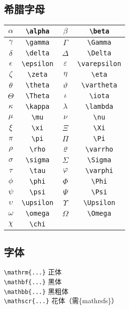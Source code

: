 \documentclass[a4paper,10pt]{ctexart}
\begin{document}
\subsection{希腊字母}
\noindent
\begin{table}[H]
	\begin{center}
		\begin{tabular}{|c|c|c|c|}
		\hline
		$\alpha$ &\verb|\alpha| &$\beta$ &\verb|\beta|\\
		\hline
		$\gamma$ &\verb|\gamma| &$\Gamma$ &\verb|\Gamma|\\
		\hline
		$\delta$ &\verb|\delta| &$\Delta$ &\verb|\Delta|\\
		\hline
		$\epsilon$ &\verb|\epsilon| &$\varepsilon$ &\verb|\varepsilon|\\
		\hline
		$\zeta$ &\verb|\zeta| &$\eta$ &\verb|\eta|\\
		\hline
		$\theta$ &\verb|\theta| &$\vartheta$ &\verb|\vartheta|\\
		\hline
		$\Theta$ &\verb|\Theta| &$\iota$ &\verb|\iota|\\
		\hline
		$\kappa$ &\verb|\kappa| &$\lambda$ &\verb|\lambda|\\
		\hline
		$\mu$ &\verb|\mu| &$\nu$ &\verb|\nu|\\
		\hline
		$\xi$ &\verb|\xi| &$\Xi$ &\verb|\Xi|\\
		\hline
		$\pi$ &\verb|\pi| &$\Pi$ &\verb|\Pi|\\
		\hline
		$\rho$ &\verb|\rho| &$\varrho$ &\verb|\varrho|\\
		\hline
		$\sigma$ &\verb|\sigma| &$\Sigma$ &\verb|\Sigma|\\
		\hline
		$\tau$ &\verb|\tau| &$\varphi$ &\verb|\varphi|\\
		\hline
		$\phi$ &\verb|\phi| &$\Phi$ &\verb|\Phi|\\
		\hline
		$\psi$ &\verb|\psi| &$\Psi$ &\verb|\Psi|\\
		\hline
		$\upsilon$ &\verb|\upsilon| &$\Upsilon$ &\verb|\Upsilon|\\
		\hline
		$\omega$ &\verb|\omega| &$\Omega$ &\verb|\Omega|\\
		\hline
		$\chi$ &\verb|\chi|&&\\
		\hline
		\end{tabular}
	\end{center}
\end{table}

\subsection{字体}
\noindent
\verb|\mathrm{...}| 正体\\
\verb|\mathbf{...}| 黑体\\
\verb|\mathbb{...}| 黑粗体\\
\verb|\mathscr{...}| 花体（需\{mathrsfs\}）\\
\end{document}
